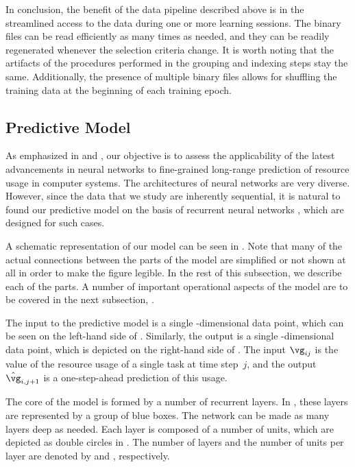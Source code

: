 In conclusion, the benefit of the data pipeline described above is in the
streamlined access to the data during one or more learning sessions. The binary
files can be read efficiently as many times as needed, and they can be readily
regenerated whenever the selection criteria change. It is worth noting that the
artifacts of the procedures performed in the grouping and indexing steps stay
the same. Additionally, the presence of multiple binary files allows for
shuffling the training data at the beginning of each training epoch.

\subsection{Predictive Model}

As emphasized in  and , our
objective is to assess the applicability of the latest advancements in neural
networks \cite{goodfellow2016} to fine-grained long-range prediction of resource
usage in computer systems. The architectures of neural networks are very
diverse. However, since the data that we study are inherently sequential, it is
natural to found our predictive model on the basis of recurrent neural networks
\cite{goodfellow2016}, which are designed for such cases.

A schematic representation of our model can be seen in
. Note that many of the actual connections between
the parts of the model are simplified or not shown at all in order to make the
figure legible. In the rest of this subsection, we describe each of the parts. A
number of important operational aspects of the model are to be covered in the
next subsection, .

The input to the predictive model is a single \ng-dimensional data point, which
can be seen on the left-hand side of . Similarly,
the output is a single \ng-dimensional data point, which is depicted on the
right-hand side of . The input $\vg_{ij}$ is the
value of the resource usage of a single task at time step~$j$, and the output
$\hat{\vg}_{i, j + 1}$ is a one-step-ahead prediction of this usage.

The core of the model is formed by a number of recurrent layers. In
, these layers are represented by a group of blue
boxes. The network can be made as many layers deep as needed. Each layer is
composed of a number of units, which are depicted as double circles in
. The number of layers and the number of units per
layer are denoted by \nl and \nu, respectively.

